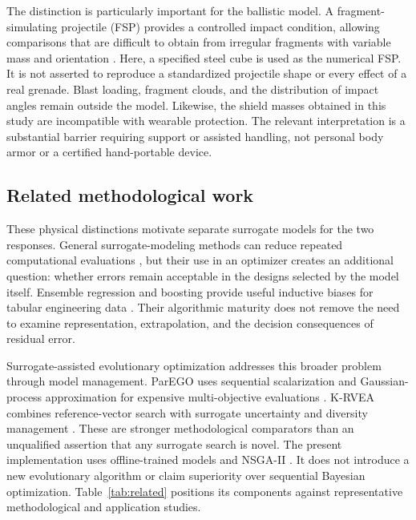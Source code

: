 The distinction is particularly important for the ballistic model. A fragment-simulating projectile (FSP) provides a controlled impact condition, allowing comparisons that are difficult to obtain from irregular fragments with variable mass and orientation \cite{CantEtAl2015FSP,Hazell2015,Crouch2016}. Here, a specified steel cube is used as the numerical FSP. It is not asserted to reproduce a standardized projectile shape or every effect of a real grenade. Blast loading, fragment clouds, and the distribution of impact angles remain outside the model. Likewise, the shield masses obtained in this study are incompatible with wearable protection. The relevant interpretation is a substantial barrier requiring support or assisted handling, not personal body armor or a certified hand-portable device.

\subsection{Related methodological work}
These physical distinctions motivate separate surrogate models for the two responses. General surrogate-modeling methods can reduce repeated computational evaluations \cite{Forrester2008Surrogate}, but their use in an optimizer creates an additional question: whether errors remain acceptable in the designs selected by the model itself. Ensemble regression and boosting provide useful inductive biases for tabular engineering data \cite{Breiman2001RF,Geurts2006ExtraTrees,Friedman2001GBM,ChenGuestrin2016XGBoost}. Their algorithmic maturity does not remove the need to examine representation, extrapolation, and the decision consequences of residual error.

Surrogate-assisted evolutionary optimization addresses this broader problem through model management. ParEGO uses sequential scalarization and Gaussian-process approximation for expensive multi-objective evaluations \cite{Knowles2006ParEGO}. K-RVEA combines reference-vector search with surrogate uncertainty and diversity management \cite{Chugh2018KRVEA}. These are stronger methodological comparators than an unqualified assertion that any surrogate search is novel. The present implementation uses offline-trained models and NSGA-II \cite{Deb2002NSGAII,Deb2000Constraints}. It does not introduce a new evolutionary algorithm or claim superiority over sequential Bayesian optimization. Table~\ref{tab:related} positions its components against representative methodological and application studies.

